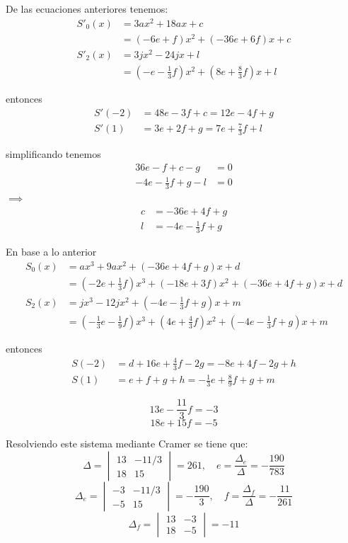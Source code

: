 \documentclass[a4paper,12pt]{article}
\begin{document}
De las ecuaciones anteriores tenemos:
\begin{align*}
    S'_0(x) &= 3ax^2 + 18ax + c \\
    &= (-6e + f)x^2 + (-36e + 6f)x + c \\
    S'_2(x) &= 3jx^2 - 24jx + l \\
    &= (-e - \frac{1}{3}f)x^2 + (8e + \frac{8}{3}f)x + l
\end{align*}

entonces
\begin{align*}
    S'(-2) &= 48e - 3f + c = 12e - 4f + g \\
    S'(1) &= 3e + 2f + g = 7e + \frac{7}{3}f + l
\end{align*}

simplificando tenemos
\begin{align*}
    36e - f + c - g &= 0 \\
    -4e - \frac{1}{3}f + g - l &= 0
\end{align*}
$\implies$
\begin{align*}
    c &= -36e + 4f + g \\
    l &= -4e - \frac{1}{3}f + g
\end{align*}

En base a lo anterior
\begin{align*}
    S_0(x) &= ax^3 + 9ax^2 + (-36e + 4f + g)x + d \\
    &= (-2e + \frac{1}{3}f)x^3 + (-18e + 3f)x^2 + (-36e + 4f + g)x + d \\
    S_2(x) &= jx^3 - 12jx^2 + (-4e - \frac{1}{3}f + g)x + m \\
    &= (-\frac{1}{3}e - \frac{1}{9}f)x^3 + (4e + \frac{4}{3}f)x^2 + (-4e - \frac{1}{3}f + g)x + m
\end{align*}

entonces
\begin{align*}
    S(-2) &= d + 16e + \frac{4}{3}f - 2g = -8e + 4f - 2g + h \\
    S(1) &= e + f + g + h = -\frac{1}{3}e + \frac{8}{9}f + g + m
\end{align*}

\newpage

\[ 13e - \frac{11}{3}f = -3 \]
\[ 18e + 15f = -5 \]

Resolviendo este sistema mediante Cramer se tiene que:
\[ \Delta = \begin{vmatrix} 13 & -11/3 \\ 18 & 15 \end{vmatrix} = 261, \quad e = \frac{\Delta_e}{\Delta} = -\frac{190}{783} \]
\[ \Delta_e = \begin{vmatrix} -3 & -11/3 \\ -5 & 15 \end{vmatrix} = -\frac{190}{3}, \quad f = \frac{\Delta_f}{\Delta} = -\frac{11}{261} \]
\[ \Delta_f = \begin{vmatrix} 13 & -3 \\ 18 & -5 \end{vmatrix} = -11 \]
\end{document}
